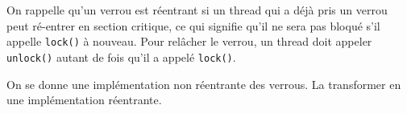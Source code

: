 
\begingroup

\begin{exercice}
  \label{exo:locks/reentrance}
  
  On rappelle qu'un verrou est réentrant si un thread qui a déjà pris un verrou peut
  ré-entrer en section critique, ce qui signifie qu'il ne sera pas bloqué s'il
  appelle \lstinline{lock()} à nouveau.
  Pour relâcher le verrou, un thread doit appeler \lstinline{unlock()} autant
  de fois qu'il a appelé \lstinline{lock()}.
  
  \begin{questions}
  \item On se donne une implémentation non réentrante des verrous.
    La transformer en une implémentation réentrante.
  \end{questions}

\end{exercice}

\endgroup
\endinput
